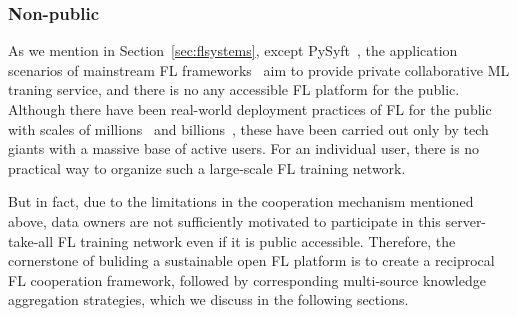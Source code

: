 \subsubsection{Non-public} %
As we mention in Section~\ref{sec:flsystems}, except PySyft~\cite{ziller2021pysyft}, the application scenarios of mainstream FL frameworks~\cite{liu2021fate, abadi2016tensorflow, zeng2021fedlab, caldas2018leaf, ibmfl2020ibm, he2020fedml, beutel2020flower, roth2022nvidia} aim to provide private collaborative ML traning service, and there is no any accessible FL platform for the public.
Although there have been real-world deployment practices of FL for the public with scales of millions~\cite{bonawitz2019towards} and billions~\cite{niu2020billion}, these have been carried out only by tech giants with a massive base of active users. For an individual user, there is no practical way to organize such a large-scale FL training network.

But in fact, due to the limitations in the cooperation mechanism mentioned above, data owners are not sufficiently motivated to participate in this server-take-all FL training network even if it is public accessible. Therefore, the cornerstone of buliding a sustainable open FL platform is to create a reciprocal FL cooperation framework, followed by corresponding multi-source knowledge aggregation strategies, which we discuss in the following sections.